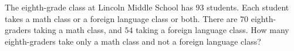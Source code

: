 The eighth-grade class at Lincoln Middle School has $93$ students. Each student takes a math class or a foreign language class or both. There are $70$ eighth-graders taking a math class, and $54$ taking a foreign language class. How many eighth-graders take only a math class and not a foreign language class?
